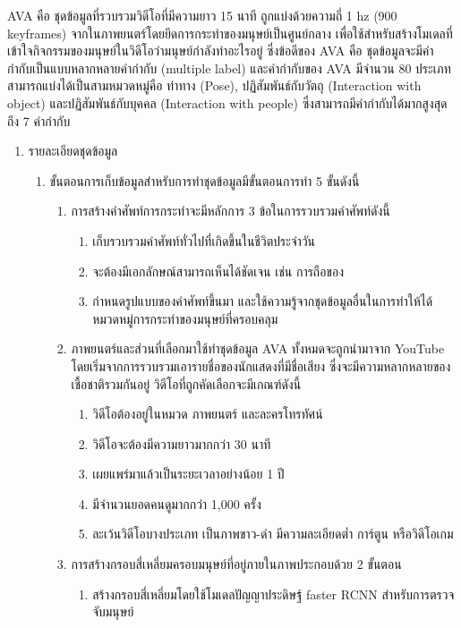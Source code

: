 AVA\textsuperscript{\cite{ava}} คือ ชุดข้อมูลที่รวบรวมวิดีโอที่มีความยาว 15 นาที ถูกแบ่งด้วยความถี่ 1 hz (900 keyframes) จากในภาพยนตร์โดยยึดการกระทำของมนุษย์เป็นศูนย์กลาง
เพื่อใช้สำหรับสร้างโมเดลที่เข้าใจกิจกรรมของมนุษย์ในวิดีโอว่ามนุษย์กำลังทำอะไรอยู่ ซึ่งข้อดีของ AVA คือ ชุดข้อมูลจะมีคำกำกับเป็นแบบหลากหลายคำกำกับ (multiple label)
และคำกำกับของ AVA มีจำนวน 80 ประเภท สามารถแบ่งได้เป็นสามหมวดหมู่คือ ท่าทาง (Pose), ปฏิสัมพันธ์กับวัตถุ (Interaction with object) 
และปฏิสัมพันธ์กับบุคคล (Interaction with people) ซึ่งสามารถมีคำกำกับได้มากสูงสุดถึง 7 คำกำกับ
\begin{enumerate}
	\item {รายละเอียดชุดข้อมูล}
	\begin{enumerate}
		\item ขั้นตอนการเก็บข้อมูลสำหรับการทำชุดข้อมูลมีขั้นตอนการทำ 5 ขั้นดังนี้
		\begin{enumerate}
			\item การสร้างคำศัพท์การกระทำจะมีหลักการ 3 ข้อในการรวบรวมคำศัพท์ดังนี้
			\begin{enumerate}
				\item เก็บรวบรวมคำศัพท์ทั่วไปที่เกิดขึ้นในชีวิตประจำวัน
				\item จะต้องมีเอกลักษณ์สามารถเห็นได้ชัดเจน เช่น การถือของ
				\item กำหนดรูปแบบของคำศัพท์ขึ้นมา และใช้ความรู้จากชุดข้อมูลอื่นในการทำให้ได้หมวดหมู่การกระทำของมนุษย์ที่ครอบคลุม
			\end{enumerate}
			\item ภาพยนตร์และส่วนที่เลือกมาใช้ทำชุดข้อมูล AVA ทั้งหมดจะถูกนำมาจาก YouTube โดยเริ่มจากการรวบรวมเอารายชื่อของนักแสดงที่มีชื่อเสียง
			ซึ่งจะมีความหลากหลายของเชื้อชาติรวมกันอยู่ วิดีโอที่ถูกคัดเลือกจะมีเกณฑ์ดังนี้
			\begin{enumerate}
				\item วิดีโอต้องอยู่ในหมวด ภาพยนตร์ และละครโทรทัศน์
				\item วิดีโอจะต้องมีความยาวมากกว่า 30 นาที
				\item เผยแพร่มาแล้วเป็นระยะเวลาอย่างน้อย 1 ปี
				\item มีจำนวนยอดคนดูมากกว่า 1,000 ครั้ง
				\item ละเว้นวิดีโอบางประเภท เป็นภาพขาว-ดำ มีความละเอียดต่ำ การ์ตูน หรือวิดีโอเกม
			\end{enumerate}
			\item การสร้างกรอบสี่เหลี่ยมครอบมนุษย์ที่อยู่ภายในภาพประกอบด้วย 2 ขั้นตอน
			\begin{enumerate}
				\item สร้างกรอบสี่เหลี่ยมโดยใช้โมเดลปัญญาประดิษฐ์ faster RCNN สำหรับการตรวจจับมนุษย์

\end{enumerate}
\end{enumerate}
\end{enumerate}
\end{enumerate}
